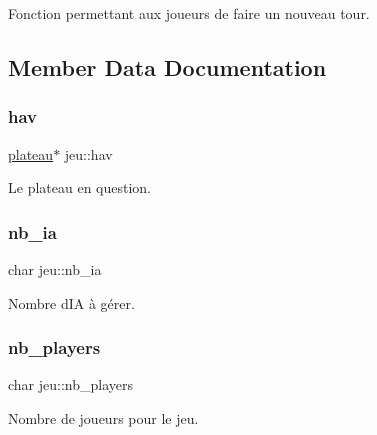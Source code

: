 Fonction permettant aux joueurs de faire un nouveau tour. 



\subsection{Member Data Documentation}
\mbox{\label{classjeu_a7bd7f0a6992c018ddc2cdf2a0c6e1930}} 
\subsubsection{\texorpdfstring{hav}{hav}}
{\footnotesize\ttfamily \hyperlink{classplateau}{plateau}$\ast$ jeu\+::hav\hspace{0.3cm}{\ttfamily [private]}}



Le plateau en question. 

\mbox{\label{classjeu_a725c0616180898259dd472d009e844fc}} 
\subsubsection{\texorpdfstring{nb\+\_\+ia}{nb\_ia}}
{\footnotesize\ttfamily char jeu\+::nb\+\_\+ia\hspace{0.3cm}{\ttfamily [private]}}



Nombre d\textquotesingle{}IA à gérer. 

\mbox{\label{classjeu_af5d010efc2e6dec9ea8da739bd5f19b5}} 
\subsubsection{\texorpdfstring{nb\+\_\+players}{nb\_players}}
{\footnotesize\ttfamily char jeu\+::nb\+\_\+players\hspace{0.3cm}{\ttfamily [private]}}



Nombre de joueurs pour le jeu. 

\mbox{\label{classjeu_ae28d01ac3e91246e6269df4d62470913}} 
